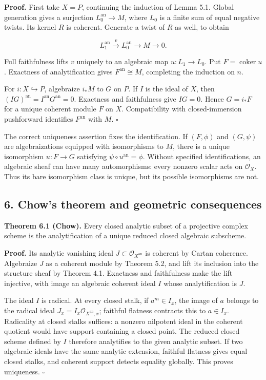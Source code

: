 \documentclass[11pt]{article}
\begin{document}
\textbf{Proof.} First take \(X=P\), continuing the induction of Lemma
5.1. Global generation gives a surjection \(L_0^{\mathrm{an}}\to M\),
where \(L_0\) is a finite sum of equal negative twists. Its kernel \(R\)
is coherent. Generate a twist of \(R\) as well, to obtain

\[
L_1^{\mathrm{an}}\xrightarrow{v}L_0^{\mathrm{an}}\to M\to0.
\]

Full faithfulness lifts \(v\) uniquely to an algebraic map
\(u:L_1\to L_0\). Put \(F=\operatorname{coker}u\). Exactness of
analytification gives \(F^{\mathrm{an}}\cong M\), completing the
induction on \(n\).

For \(i:X\hookrightarrow P\), algebraize \(i_*M\) to \(G\) on \(P\). If
\(I\) is the ideal of \(X\), then
\((IG)^{\mathrm{an}}=I^{\mathrm{an}}G^{\mathrm{an}}=0\). Exactness and
faithfulness give \(IG=0\). Hence \(G=i_*F\) for a unique coherent
module \(F\) on \(X\). Compatibility with closed-immersion pushforward
identifies \(F^{\mathrm{an}}\) with \(M\). \(\square\)

The correct uniqueness assertion fixes the identification. If
\((F,\phi)\) and \((G,\psi)\) are algebraizations equipped with
isomorphisms to \(M\), there is a unique isomorphism \(u:F\to G\)
satisfying \(\psi\circ u^{\mathrm{an}}=\phi\). Without specified
identifications, an algebraic sheaf can have many automorphisms: every
nonzero scalar acts on \(\mathcal O_X\). Thus its bare isomorphism class
is unique, but its possible isomorphisms are not.

\subsection{6. Chow's theorem and geometric
consequences}\label{chows-theorem-and-geometric-consequences}

\textbf{Theorem 6.1 (Chow).} Every closed analytic subset of a
projective complex scheme is the analytification of a unique reduced
closed algebraic subscheme.

\textbf{Proof.} Its analytic vanishing ideal
\(J\subset\mathcal O_{X^{\mathrm{an}}}\) is coherent by Cartan
coherence. Algebraize \(J\) as a coherent module by Theorem 5.2, and
lift its inclusion into the structure sheaf by Theorem 4.1. Exactness
and faithfulness make the lift injective, with image an algebraic
coherent ideal \(I\) whose analytification is \(J\).

The ideal \(I\) is radical. At every closed stalk, if \(a^m\in I_x\),
the image of \(a\) belongs to the radical ideal
\(J_x=I_x\mathcal O_{X^{\mathrm{an}},x}\); faithful flatness contracts
this to \(a\in I_x\). Radicality at closed stalks suffices: a nonzero
nilpotent ideal in the coherent quotient would have support containing a
closed point. The reduced closed scheme defined by \(I\) therefore
analytifies to the given analytic subset. If two algebraic ideals have
the same analytic extension, faithful flatness gives equal closed
stalks, and coherent support detects equality globally. This proves
uniqueness. \(\square\)
\end{document}
